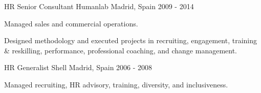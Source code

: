 \begin{cventries}
   \cventry
    {HR Senior Consultant} %
    {Humanlab} %
    {Madrid, Spain} %
    {2009 - 2014} %
    {
      \begin{cvitems} %
        \item {Managed sales and commercial operations.}
        \item {Designed methodology and executed projects in recruiting, engagement, training \& reskilling, performance, professional coaching, and change management.}
      \end{cvitems}
    }

   \cventry
    {HR Generalist} %
    {Shell} %
    {Madrid, Spain} %
    {2006 - 2008} %
    {
      \begin{cvitems} %
        \item {Managed recruiting, HR advisory, training, diversity, and inclusiveness.}
      \end{cvitems}
    }
\end{cventries}
